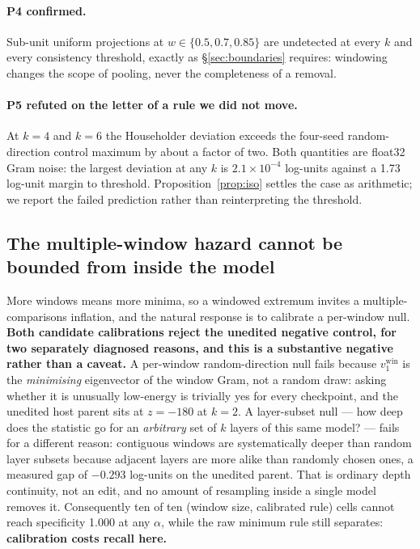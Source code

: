 \documentclass[11pt,letterpaper]{article}
\begin{document}
\paragraph{P4 confirmed.} Sub-unit uniform projections at $w \in \{0.5, 0.7, 0.85\}$ are undetected at every $k$ and every consistency threshold, exactly as \S\ref{sec:boundaries} requires: windowing changes the scope of pooling, never the completeness of a removal.

\paragraph{P5 refuted on the letter of a rule we did not move.} At $k = 4$ and $k = 6$ the Householder deviation exceeds the four-seed random-direction control maximum by about a factor of two. Both quantities are float32 Gram noise: the largest deviation at any $k$ is $2.1\times10^{-4}$ log-units against a 1.73 log-unit margin to threshold. Proposition~\ref{prop:iso} settles the case as arithmetic; we report the failed prediction rather than reinterpreting the threshold.

\subsection{The multiple-window hazard cannot be bounded from inside the model}

More windows means more minima, so a windowed extremum invites a multiple-comparisons inflation, and the natural response is to calibrate a per-window null. \textbf{Both candidate calibrations reject the unedited negative control, for two separately diagnosed reasons, and this is a substantive negative rather than a caveat.} A per-window random-direction null fails because $v_1^{\text{win}}$ is the \emph{minimising} eigenvector of the window Gram, not a random draw: asking whether it is unusually low-energy is trivially yes for every checkpoint, and the unedited host parent sits at $z = -180$ at $k = 2$. A layer-subset null --- how deep does the statistic go for an \emph{arbitrary} set of $k$ layers of this same model? --- fails for a different reason: contiguous windows are systematically deeper than random layer subsets because adjacent layers are more alike than randomly chosen ones, a measured gap of $-0.293$ log-units on the unedited parent. That is ordinary depth continuity, not an edit, and no amount of resampling inside a single model removes it. Consequently ten of ten (window size, calibrated rule) cells cannot reach specificity 1.000 at any $\alpha$, while the raw minimum rule still separates: \textbf{calibration costs recall here.}
\end{document}
